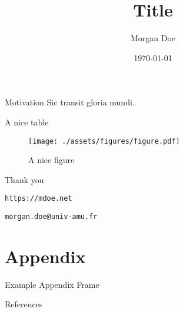 \documentclass[aspectratio=169,10pt]{beamer}
\title{Title}
\author{Morgan Doe}
\institute{Aix-Marseille School of Economics}
\date{\today}
\begin{document}
\maketitle

\begin{frame}{Motivation}
  \hypertarget{starting_page}{}
  Sic transit gloria mundi. \cite{Doe}
  \hyperlink{appendix}{}
\end{frame}

\begin{frame}[plain]
  \begin{table}[H]
    \centering
    \footnotesize
    
    \caption{A nice table}
    \label{tab:nice_table}
  \end{table}
\end{frame}

\begin{frame}[plain]
  \begin{figure}
    \centering
    \texttt{[image: ./assets/figures/figure.pdf]}
    \caption{A nice figure}
    \label{fig:nice_figure}
  \end{figure}
\end{frame}

\begin{frame}[standout]
  \Large{Thank you}
  \vspace{1em}

  \small{{\tt https://mdoe.net}}

  \small{{\tt morgan.doe@univ-amu.fr}}
\end{frame}

\appendix
\section{Appendix}

\begin{frame}{Example Appendix Frame}
  \hypertarget{appendix}{}
  \hyperlink{starting_page}{}
\end{frame}

\begin{frame}[allowframebreaks]{References}
  \tiny
  \begingroup
  \renewcommand{\section}[2]{} %
  \endgroup
\end{frame}
\end{document}
